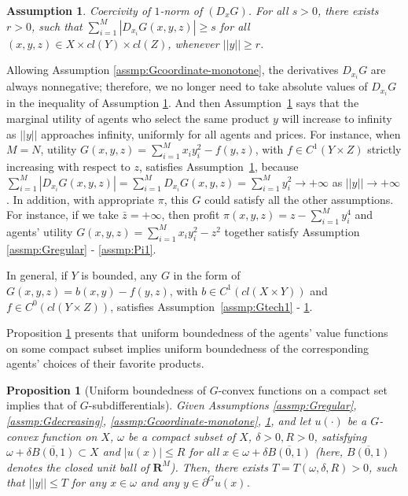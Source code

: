 \documentclass[a4paper, 11pt]{amsart}
\numberwithin{equation}{section}
\theoremstyle{plain}
\newtheorem{proposition}[theorem]{Proposition}
\newtheorem{assumption}{Assumption}
\theoremstyle{definition}
\theoremstyle{remark}
\newcommand{\R}{\mathbf{R}}
\begin{document}
\begin{assumption}\label{assmp:Gtech3}
	 Coercivity of {$1$-norm} of $(D_xG)$. For all $ s>0$, there exists $r>0$, such that $\sum_{i=1}^{M} |D_{x_i}G(x,y,z)|\ge s$ for all $(x, y, z)\in X\times  cl(Y) \times cl(Z)$, whenever $||y||\ge r$.
\end{assumption}



{Allowing Assumption \ref{assmp:Gcoordinate-monotone}, {the derivatives $D_{x_i}G$ are always nonnegative; therefore,} we no longer need to take absolute values of $D_{x_i}G$ in the inequality of Assumption \ref{assmp:Gtech3}.} And then Assumption~\ref{assmp:Gtech3} says that the marginal utility of agents who select the same product $y$ will increase to infinity as $||y||$ approaches infinity, uniformly for all agents and prices. {For instance, when $M = N$, utility $G(x,y,z) = \sum_{i=1}^{M} x_iy_i^2 -f(y,z) $, with $f \in C^1(Y \times Z)$ strictly increasing with respect to $z$, satisfies Assumption~\ref{assmp:Gtech3}, because $\sum_{i=1}^{M} \left|D_{x_i}G(x,y,z)\right| = \sum_{i=1}^{M} D_{x_i}G(x,y,z) = \sum_{i=1}^{M} y_i^2 \longrightarrow +\infty$ as $||y|| \longrightarrow + \infty$. In addition, with appropriate $\pi$, this $G$ could satisfy all the other assumptions. For instance, if we take $\bar{z} = +\infty$, then profit $\pi(x,y,z) = z - \sum_{i=1}^{M} y_i^4$ and agents' utility $G(x,y,z)= \sum_{i=1}^{M} x_iy_i^2 - z^2 $ together satisfy Assumption \ref{assmp:Gregular} -  \ref{assmp:Pi1}.}\medskip


In general, if $Y$ is bounded, any $G$ in the form of $G(x,y,z) = b(x,y) - f(y,z)$, with $b \in C^1(cl(X\times Y))$ and $f\in C^0(cl(Y \times Z))$, satisfies Assumption~\ref{assmp:Gtech1} - \ref{assmp:Gtech3}. %
\medskip


Proposition \ref{Subdiff/Bdd} presents that uniform boundedness of the agents' value functions on some compact subset implies uniform boundedness of the corresponding agents' choices of their favorite products. \medskip

\begin{proposition}[{Uniform boundedness of $G$-convex functions on a compact set implies that of $G$-subdifferentials}]\label{Subdiff/Bdd}
	Given Assumptions \ref{assmp:Gregular}, \ref{assmp:Gdecreasing}, \ref{assmp:Gcoordinate-monotone}, \ref{assmp:Gtech3}, and let $u(\cdot)$ be a $G$-convex function on $X$, $\omega$ be a compact subset of $X$, $\delta>0, R>0$, satisfying $\omega+\delta\overline{B(0,1)}\subset X$ and $|u(x)|\le R$ for all $x\in \omega + \delta \overline{B(0,1)}$ (here, $\overline{B(0,1)}$ denotes the closed unit ball of $\R^M$). Then, there exists $T = T(\omega,\delta, R) > 0$, such that $||y||\le T$ for any $x \in \omega$ and any $y\in \partial^Gu(x)$.
\end{proposition}
\end{document}
